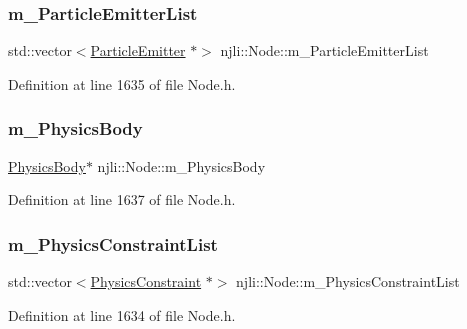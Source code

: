 \subsubsection{\texorpdfstring{m\+\_\+\+Particle\+Emitter\+List}{m\_ParticleEmitterList}}
{\footnotesize\ttfamily std\+::vector$<$\mbox{\hyperlink{classnjli_1_1_particle_emitter}{Particle\+Emitter}} $\ast$$>$ njli\+::\+Node\+::m\+\_\+\+Particle\+Emitter\+List\hspace{0.3cm}{\ttfamily [private]}}



Definition at line 1635 of file Node.\+h.

\mbox{\label{classnjli_1_1_node_acb3dd8658ad0f052d0afff42c5257367}} 
\subsubsection{\texorpdfstring{m\+\_\+\+Physics\+Body}{m\_PhysicsBody}}
{\footnotesize\ttfamily \mbox{\hyperlink{classnjli_1_1_physics_body}{Physics\+Body}}$\ast$ njli\+::\+Node\+::m\+\_\+\+Physics\+Body\hspace{0.3cm}{\ttfamily [private]}}



Definition at line 1637 of file Node.\+h.

\mbox{\label{classnjli_1_1_node_a90d39973dc81175e6adca0d979c96e8b}} 
\subsubsection{\texorpdfstring{m\+\_\+\+Physics\+Constraint\+List}{m\_PhysicsConstraintList}}
{\footnotesize\ttfamily std\+::vector$<$\mbox{\hyperlink{classnjli_1_1_physics_constraint}{Physics\+Constraint}} $\ast$$>$ njli\+::\+Node\+::m\+\_\+\+Physics\+Constraint\+List\hspace{0.3cm}{\ttfamily [private]}}



Definition at line 1634 of file Node.\+h.


